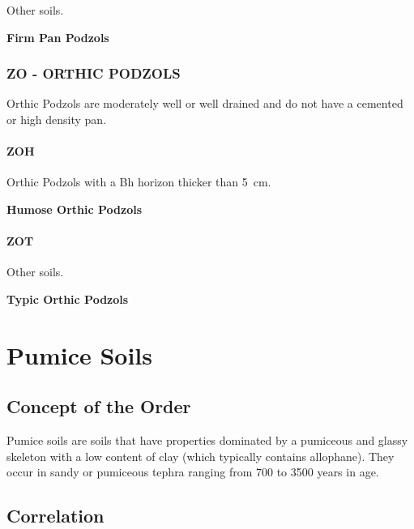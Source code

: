 \documentclass[
  letterpaper,
  DIV=11,
  numbers=noendperiod]{scrreprt}
\begin{document}
Other soils.

\textbf{Firm Pan Podzols}

\hypertarget{sec-ZO}{%
\subsection{\texorpdfstring{\textbf{ZO} - ORTHIC
PODZOLS}{ZO - ORTHIC PODZOLS}}\label{sec-ZO}}

Orthic Podzols are moderately well or well drained and do not have a
cemented or high density pan.

\hypertarget{sec-key-ZOH}{%
\subsubsection{\texorpdfstring{\textbf{ZOH}}{ZOH}}\label{sec-key-ZOH}}

Orthic Podzols with a Bh horizon thicker than 5~cm.

\textbf{Humose Orthic Podzols}

\hypertarget{sec-key-ZOT}{%
\subsubsection{\texorpdfstring{\textbf{ZOT}}{ZOT}}\label{sec-key-ZOT}}

Other soils.

\textbf{Typic Orthic Podzols}


\hypertarget{sec-ord-M}{%
\chapter{Pumice Soils}\label{sec-ord-M}}

\hypertarget{sec-con-M}{%
\section{Concept of the Order}\label{sec-con-M}}

Pumice soils are soils that have properties dominated by a pumiceous and
glassy skeleton with a low content of clay (which typically contains
allophane). They occur in sandy or pumiceous tephra ranging from 700 to
3500 years in age.

\hypertarget{sec-cor-M}{%
\section{Correlation}\label{sec-cor-M}}
\end{document}
